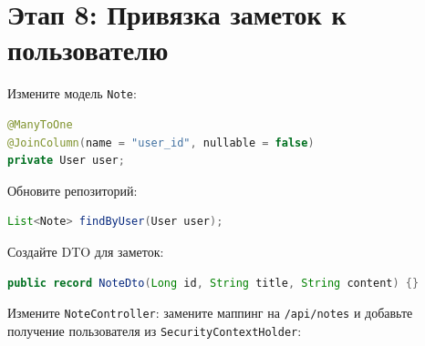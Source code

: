 \documentclass[a4paper,12pt]{article}
\begin{document}
\section*{Этап 8: Привязка заметок к пользователю}

Измените модель \texttt{Note}:

\begin{lstlisting}[language=Java,caption=Note.java]
@ManyToOne
@JoinColumn(name = "user_id", nullable = false)
private User user;
\end{lstlisting}

Обновите репозиторий:

\begin{lstlisting}[language=Java,caption=NoteRepository.java]
List<Note> findByUser(User user);
\end{lstlisting}

Создайте DTO для заметок:

\begin{lstlisting}[language=Java,caption=NoteDto.java]
public record NoteDto(Long id, String title, String content) {}
\end{lstlisting}

Измените \texttt{NoteController}: замените маппинг на \texttt{/api/notes} и добавьте получение пользователя из \texttt{SecurityContextHolder}:
\end{document}

